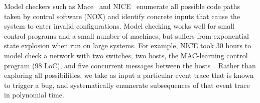 
Model checkers such as Mace~\cite{Killian:2007:MLS:1250734.1250755} and
NICE~\cite{nice} enumerate all possible code paths taken by control software (NOX)
and identify concrete inputs that cause
the system to enter invalid configurations. Model checking works well for small
control programs and a small number of machines, but suffers from exponential
state explosion when run on large systems. For example, NICE took 30 hours to
model check a network with two switches, two hosts, the MAC-learning
control program (98 LoC), and five concurrent
messages between the hosts~\cite{nice}. Rather than exploring all
possibilities, we take as input a particular event trace that is known to
trigger a bug, and systematically enumerate subsequences of that event trace
in polynomial time.

